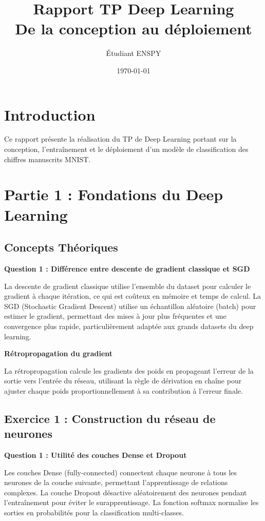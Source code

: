 \documentclass[12pt,a4paper]{article}
\title{Rapport TP Deep Learning\\De la conception au déploiement}
\author{Étudiant ENSPY}
\date{\today}
\begin{document}
\maketitle

\section{Introduction}
Ce rapport présente la réalisation du TP de Deep Learning portant sur la conception, l'entraînement et le déploiement d'un modèle de classification des chiffres manuscrits MNIST.

\section{Partie 1 : Fondations du Deep Learning}

\subsection{Concepts Théoriques}

\textbf{Question 1 : Différence entre descente de gradient classique et SGD}

La descente de gradient classique utilise l'ensemble du dataset pour calculer le gradient à chaque itération, ce qui est coûteux en mémoire et temps de calcul. La SGD (Stochastic Gradient Descent) utilise un échantillon aléatoire (batch) pour estimer le gradient, permettant des mises à jour plus fréquentes et une convergence plus rapide, particulièrement adaptée aux grands datasets du deep learning.

\textbf{Rétropropagation du gradient}

La rétropropagation calcule les gradients des poids en propageant l'erreur de la sortie vers l'entrée du réseau, utilisant la règle de dérivation en chaîne pour ajuster chaque poids proportionnellement à sa contribution à l'erreur finale.

\subsection{Exercice 1 : Construction du réseau de neurones}

\textbf{Question 1 : Utilité des couches Dense et Dropout}

Les couches Dense (fully-connected) connectent chaque neurone à tous les neurones de la couche suivante, permettant l'apprentissage de relations complexes. La couche Dropout désactive aléatoirement des neurones pendant l'entraînement pour éviter le surapprentissage. La fonction softmax normalise les sorties en probabilités pour la classification multi-classes.
\end{document}
